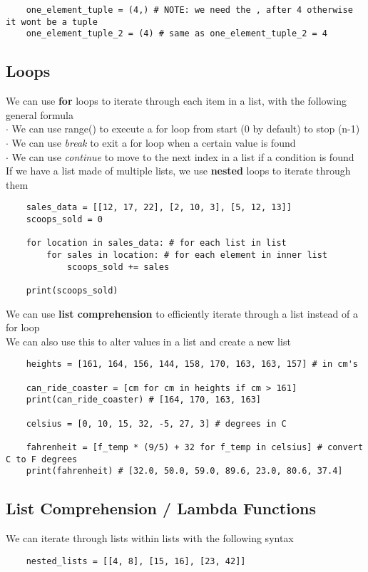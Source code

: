 \documentclass[11pt, a4paper]{article}
\begin{document}
\begin{spacing}{1.1}
\begin{lstlisting}
	one_element_tuple = (4,) # NOTE: we need the , after 4 otherwise it wont be a tuple
	one_element_tuple_2 = (4) # same as one_element_tuple_2 = 4	 \end{lstlisting} \vspace*{4mm}	
	\subsection{Loops}
	We can use \textbf{for} loops to iterate through each item in a list, with the following general formula \\
	\hspace*{1.5mm} $\cdot$ We can use range() to execute a for loop from start (0 by default) to stop (n-1) \\
	\hspace*{1.5mm} $\cdot$ We can use \textit{break} to exit a for loop when a certain value is found \\
	\hspace*{1.5mm} $\cdot$ We can use \textit{continue} to move to the next index in a list if a condition is found \\
	If we have a list made of multiple lists, we use \textbf{nested} loops to iterate through them
	\begin{lstlisting}
	sales_data = [[12, 17, 22], [2, 10, 3], [5, 12, 13]]
	scoops_sold = 0
	
	for location in sales_data: # for each list in list
		for sales in location: # for each element in inner list
			scoops_sold += sales
	
	print(scoops_sold) \end{lstlisting} \newpage
	\noindent We can use \textbf{list comprehension} to efficiently iterate through a list instead of a for loop \\
	We can also use this to alter values in a list and create a new list
	\begin{lstlisting}
	heights = [161, 164, 156, 144, 158, 170, 163, 163, 157] # in cm's
	
	can_ride_coaster = [cm for cm in heights if cm > 161]
	print(can_ride_coaster) # [164, 170, 163, 163] 
	
	celsius = [0, 10, 15, 32, -5, 27, 3] # degrees in C
	
	fahrenheit = [f_temp * (9/5) + 32 for f_temp in celsius] # convert C to F degrees
	print(fahrenheit) # [32.0, 50.0, 59.0, 89.6, 23.0, 80.6, 37.4] \end{lstlisting}\vspace*{4mm}	
	\subsection{List Comprehension / Lambda Functions}
	We can iterate through lists within lists with the following syntax
	\begin{lstlisting}
	nested_lists = [[4, 8], [15, 16], [23, 42]]
	

\end{lstlisting}
\end{spacing}
\end{document}
